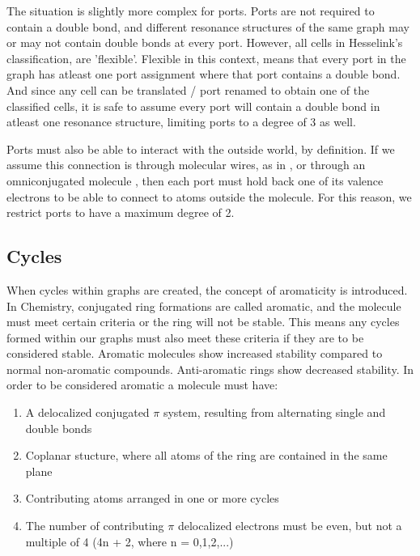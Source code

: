 \documentclass[12pt]{article}
\begin{document}
The situation is slightly more complex for ports. Ports are not required to contain a double bond, and different resonance structures of the same graph may or may not contain double bonds at every port. However, all cells in Hesselink's classification, are 'flexible'. Flexible in this context, means that every port in the graph has atleast one port assignment where that port contains a double bond. And since any cell can be translated / port renamed to obtain one of the classified cells, it is safe to assume every port will contain a double bond in atleast one resonance structure, limiting ports to a degree of 3 as well. 

Ports must also be able to interact with the outside world, by definition. If we assume this connection is through molecular wires, as in \cite{9}, or through an omniconjugated molecule \cite{v06}, then each port must hold back one of its valence electrons to be able to connect to atoms outside the molecule. For this reason, we restrict ports to have a maximum degree of 2. 

\subsection{Cycles}
When cycles within graphs are created, the concept of aromaticity is introduced. In Chemistry, conjugated ring formations are called aromatic, and the molecule must meet certain criteria or the ring will not be stable. This means any cycles formed within our graphs must also meet these criteria if they are to be considered stable. Aromatic molecules show increased stability compared to normal non-aromatic compounds. Anti-aromatic rings show decreased stability. In order to be considered aromatic a molecule must have:

\begin{enumerate}
\item{A delocalized conjugated $\pi$ system, resulting from alternating single and double bonds}
\item{Coplanar stucture, where all atoms of the ring are contained in the same plane}
\item{Contributing atoms arranged in one or more cycles}
\item{The number of contributing $\pi$ delocalized electrons must be even, but not a multiple of 4 (4n + 2, where n = 0,1,2,...)}
\end{enumerate}
\end{document}
